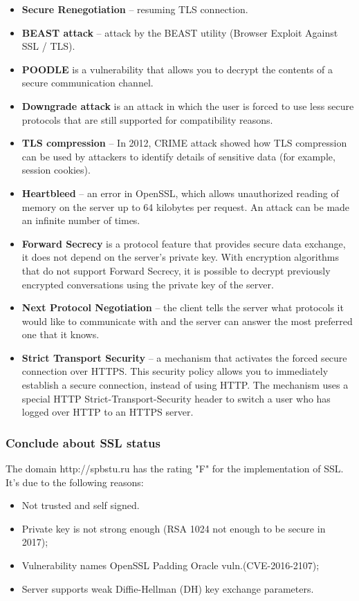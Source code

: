 \documentclass[14pt,a4paper,report]{report}
\begin{document}
\begin{itemize}
	\item \textbf{Secure Renegotiation} -- resuming TLS connection.
	\item \textbf{BEAST attack} -- attack by the BEAST utility (Browser Exploit Against SSL / TLS).
	\item \textbf{POODLE} is a vulnerability that allows you to decrypt the contents of a secure communication channel.
	\item \textbf{Downgrade attack} is an attack in which the user is forced to use less secure protocols that are still supported for compatibility reasons.
	\item \textbf{TLS compression} -- In 2012, CRIME attack showed how TLS compression can be used by attackers to identify details of sensitive data (for example, session cookies).
	\item \textbf{Heartbleed} -- an error in OpenSSL, which allows unauthorized reading of memory on the server up to 64 kilobytes per request. An attack can be made an infinite number of times.
	\item\textbf{Forward Secrecy} is a protocol feature that provides secure data exchange, it does not depend on the server’s private key. With encryption algorithms that do not support Forward Secrecy, it is possible to decrypt previously encrypted conversations using the private key of the server.
	\item \textbf{Next Protocol Negotiation} -- the client tells the server what protocols it would like to communicate with and the server can answer the most preferred one that it knows.
	\item \textbf{Strict Transport Security} -- a mechanism that activates the forced secure connection over HTTPS. This security policy allows you to immediately establish a secure connection, instead of using HTTP. The mechanism uses a special HTTP Strict-Transport-Security header to switch a user who has logged over HTTP to an HTTPS server.
\end{itemize}

\subsubsection{Conclude about SSL status}

The domain http://spbstu.ru has the rating "F" for the implementation of SSL. It's due to the following reasons:

\begin{itemize}
	\item Not trusted and self signed.
	\item Private key is not strong enough (RSA 1024 not enough to be secure in 2017);
	\item Vulnerability names OpenSSL Padding Oracle vuln.(CVE-2016-2107);
	\item Server supports weak Diffie-Hellman (DH) key exchange parameters.
\end{itemize}
\end{document}
